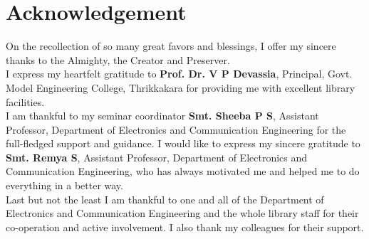 \documentclass[hidelinks, 12pt]{report}
\begin{document}
    


\section*{\centering Acknowledgement}

\justify
On the recollection of so many great favors and blessings, I offer my sincere thanks to the Almighty, the Creator and Preserver.\\

I express my heartfelt gratitude to \textbf{Prof. Dr. V P Devassia}, Principal, Govt. Model Engineering College, Thrikkakara for providing me with excellent library facilities. \\

I am thankful to my seminar coordinator \textbf{Smt. Sheeba P S}, Assistant Professor, Department of Electronics and Communication Engineering for the full-fledged support and guidance. I would like to express my sincere gratitude to \textbf{Smt. Remya S}, Assistant Professor, Department of Electronics and Communication Engineering, who has always motivated me and helped me to do everything in a better way.  \\

Last but not the least I am thankful to one and all of the Department of Electronics and Communication Engineering and the whole library staff for their co-operation and active involvement.
I also thank my colleagues for their support.
\hbox{} \newpage 
{} 
\pagestyle{fancy}
\end{document}
